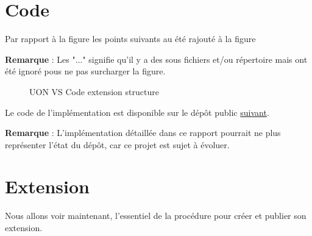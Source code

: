 \documentclass[
    iict, %
    il, %
]{heig-tb}
\begin{document}


\section{Code}

Par rapport à la figure %
les points suivants au été rajouté à la figure %

\textbf{Remarque} : Les "..." signifie qu'il y a des sous fichiers et/ou répertoire mais ont été ignoré pous ne pas surcharger
la figure.

\begin{figure}[!h]
    \centering
    \caption{UON VS Code extension structure}
\end{figure}

Le code de l'implémentation est disponible sur le dépôt public \href{https://github.com/vitorva/vscode-uon}{suivant}.

\textbf{Remarque} : L'implémentation détaillée dans ce rapport pourrait ne plus représenter l'état du dépôt, car ce projet est sujet à évoluer.

\section{Extension}
Nous allons voir maintenant, l'essentiel de la procédure pour créer et publier son extension.
\end{document}
